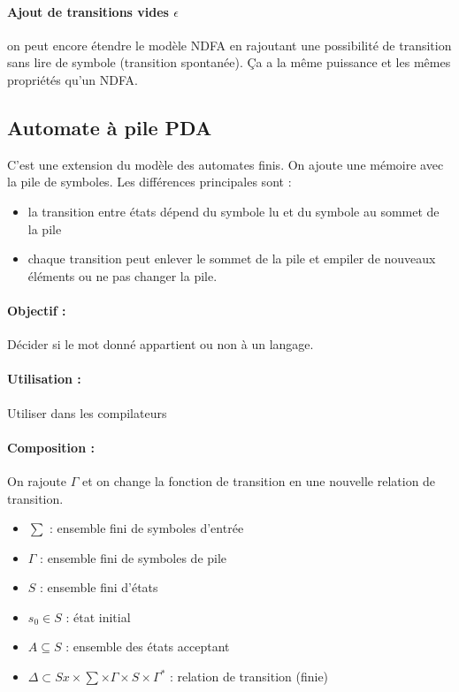 \documentclass[11pt,a4paper]{article}
\theoremstyle{definition}
\begin{document}
\paragraph{Ajout de transitions vides $\epsilon$} on peut encore étendre le modèle NDFA en 
rajoutant une possibilité de transition sans lire de symbole (transition 
spontanée). Ça a la même puissance et les mêmes propriétés qu'un NDFA.


\subsection{Automate à pile PDA}
\label{sub:automate_pile}
C'est une extension du modèle des automates finis. On ajoute une mémoire avec 
la pile de symboles.
Les différences principales sont :
\begin{itemize}
	\item la transition entre états dépend du symbole lu et du symbole au 
		sommet de la pile
	\item	chaque transition peut enlever le sommet de la pile et empiler 
		de nouveaux éléments ou ne pas changer la pile.
\end{itemize}

\paragraph{Objectif :} Décider si le mot donné appartient ou non à un langage.

\paragraph{Utilisation :} Utiliser dans les compilateurs

\paragraph{Composition :}
On rajoute $\Gamma$ et on change la fonction de transition en une nouvelle 
relation de transition.
\begin{itemize}
	\item $\sum$ : ensemble fini de symboles d'entrée
	\item $\Gamma$ : ensemble fini de symboles de pile
	\item $S$ : ensemble fini d'états
	\item $s_0 \in S$ : état initial
	\item $A \subseteq S$ : ensemble des états acceptant
	\item $\Delta \subset Sx\times \sum \times \Gamma \times S \times 
		\Gamma^*$ : relation de transition (finie)
\end{itemize}
\end{document}
